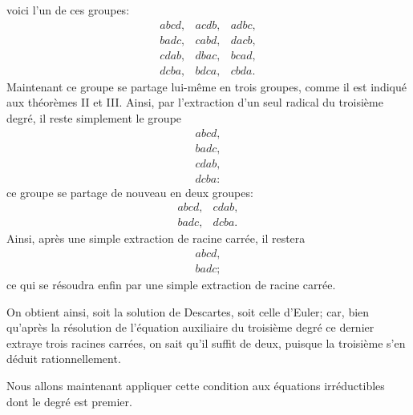 
voici l'un de ces groupes:
\[
\begin{array}{ccc}
  abcd, & acdb, & adbc,  \\
  badc, & cabd, & dacb,  \\
  cdab, & dbac, & bcad,  \\
  dcba, & bdca, & cbda.
\end{array}
\]
Maintenant ce groupe se partage lui-même en trois groupes,
comme il est indiqué aux théorèmes II et III. Ainsi, par l'extraction
d'un seul radical du troisième degré, il reste simplement le
groupe
\[
\begin{array}{l}
  abcd,  \\
  badc,  \\
  cdab,  \\
  dcba:
\end{array}
\]
ce groupe se partage de nouveau en deux groupes:
\[
\begin{array}{ll}
  abcd, & cdab,  \\
  badc, & dcba.
\end{array}
\]
Ainsi, après une simple extraction de racine carrée, il restera
\[
\begin{array}{l}
  abcd,  \\
  badc;
\end{array}
\]
ce qui se résoudra enfin par une simple extraction de racine
carrée.

On obtient ainsi, soit la solution de Descartes, soit celle
d'Euler; car, bien qu'après la résolution de l'équation auxiliaire
du troisième degré ce dernier extraye trois racines carrées, on
sait qu'il suffit de deux, puisque la troisième s'en déduit rationnellement.

Nous allons maintenant appliquer cette condition aux équations
irréductibles dont le degré est premier.
